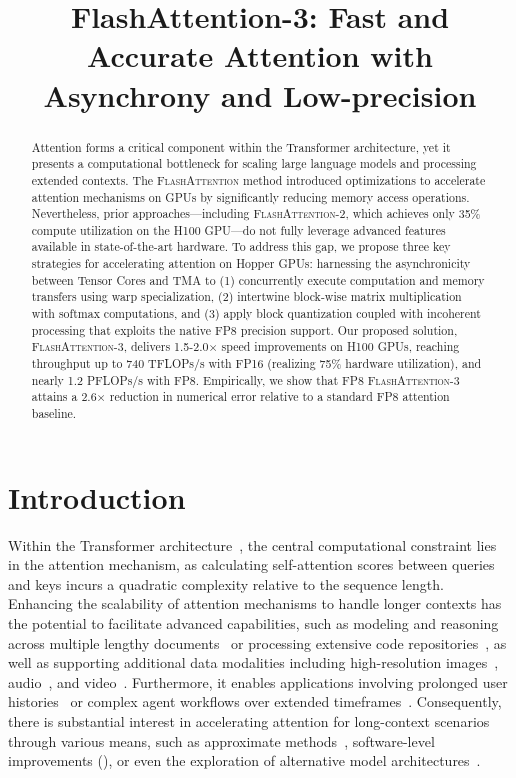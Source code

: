\title{FlashAttention-3: Fast and Accurate Attention with Asynchrony and Low-precision}

\begin{abstract}
Attention forms a critical component within the Transformer architecture, yet it presents a computational bottleneck for scaling large language models and processing extended contexts. The \textsc{FlashAttention} method introduced optimizations to accelerate attention mechanisms on GPUs by significantly reducing memory access operations. Nevertheless, prior approaches—including \textsc{FlashAttention-2}, which achieves only 35\% compute utilization on the H100 GPU—do not fully leverage advanced features available in state-of-the-art hardware. To address this gap, we propose three key strategies for accelerating attention on Hopper GPUs: harnessing the asynchronicity between Tensor Cores and TMA to (1) concurrently execute computation and memory transfers using warp specialization, (2) intertwine block-wise matrix multiplication with softmax computations, and (3) apply block quantization coupled with incoherent processing that exploits the native FP8 precision support. Our proposed solution, \textsc{FlashAttention-3}, delivers 1.5-2.0$\times$ speed improvements on H100 GPUs, reaching throughput up to 740 TFLOPs/s with FP16 (realizing 75\% hardware utilization), and nearly 1.2 PFLOPs/s with FP8. Empirically, we show that FP8 \textsc{FlashAttention-3} attains a 2.6$\times$ reduction in numerical error relative to a standard FP8 attention baseline.
\end{abstract}

\section{Introduction}
\label{sec:intro}

Within the Transformer architecture~\citep{vaswani2017attention}, the central computational constraint lies in the attention mechanism, as calculating self-attention scores between queries and keys incurs a quadratic complexity relative to the sequence length. Enhancing the scalability of attention mechanisms to handle longer contexts has the potential to facilitate advanced capabilities, such as modeling and reasoning across multiple lengthy documents~\citep{guo2021longt5,shaham2022scrolls,peng2023yarn} or processing extensive code repositories~\citep{roziere2023code, li2023starcoder}, as well as supporting additional data modalities including high-resolution images~\citep{chen2022scaling}, audio~\citep{gulati2020conformer}, and video~\citep{ho2022video}. Furthermore, it enables applications involving prolonged user histories~\citep{sun2019bert4rec} or complex agent workflows over extended timeframes~\citep{yao2022react}. Consequently, there is substantial interest in accelerating attention for long-context scenarios through various means, such as approximate methods~\citep{katharopoulos2020transformers,choromanski2020rethinking,
tay2020efficient}, software-level improvements (\citep{rabe2021self,dao2022flashattention,kwon2023efficient}), or even the exploration of alternative model architectures~\citep{peng2023rwkv,sun2023retentive,gu2023mamba}.

